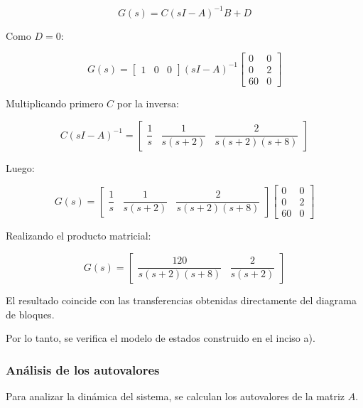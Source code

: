 \documentclass[12pt,a4paper]{article}
\begin{document}
\begin{equation}G(s)=C(sI-A)^{-1}B+D\end{equation}

Como $D=0$:

\begin{equation}G(s)=\begin{bmatrix}1&0&0\end{bmatrix} (sI-A)^{-1} \begin{bmatrix}0&0\\0&2\\60&0\end{bmatrix}\end{equation}

Multiplicando primero $C$ por la inversa:

\begin{equation}C(sI-A)^{-1}=\begin{bmatrix}\dfrac{1}{s}&\dfrac{1}{s(s+2)}&\dfrac{2}{s(s+2)(s+8)}\end{bmatrix}\end{equation}

Luego:

\begin{equation}G(s)=\begin{bmatrix}\dfrac{1}{s}&\dfrac{1}{s(s+2)}&\dfrac{2}{s(s+2)(s+8)}\end{bmatrix} \begin{bmatrix}0&0\\0&2\\60&0\end{bmatrix}\end{equation}

Realizando el producto matricial:

\begin{equation}\boxed{G(s)=\begin{bmatrix}\dfrac{120}{s(s+2)(s+8)}&\dfrac{2}{s(s+2)}\end{bmatrix}}\end{equation}

El resultado coincide con las transferencias obtenidas directamente del diagrama de bloques.

Por lo tanto, se verifica el modelo de estados construido en el inciso a).
\subsubsection*{Análisis de los autovalores}
Para analizar la dinámica del sistema, se calculan los autovalores de la matriz $A$.
\end{document}
